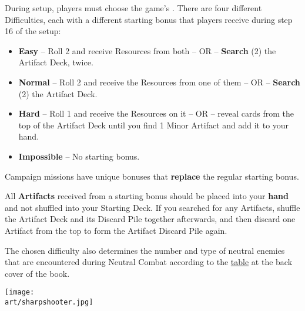 
\begin{multicols}{2}

During setup, players must choose the game's .
There are four different Difficulties, each with a different starting bonus that players receive during step 16 of the setup:
\begin{itemize}
  \item \textbf{Easy} – Roll 2  and receive Resources from both – OR – \textbf{Search} (2) the Artifact Deck, twice.
  \item \textbf{Normal} – Roll 2  and receive the Resources from one of them – OR – \textbf{Search} (2) the Artifact Deck.
  \item \textbf{Hard} – Roll 1  and receive the Resources on it – OR – reveal cards from the top of the Artifact Deck until you find 1 Minor Artifact and add it to your hand.
  \item \textbf{Impossible} – No starting bonus.
\end{itemize}

\columnbreak

Campaign missions have unique bonuses that \textbf{replace} the regular starting bonus.

All \textbf{Artifacts} received from a starting bonus should be placed into your \textbf{hand} and not shuffled into your Starting Deck.
If you searched for any Artifacts, shuffle the Artifact Deck and its Discard Pile together afterwards, and then discard one Artifact from the top to form the Artifact Discard Pile again.\par
The chosen difficulty also determines the number and type of neutral enemies that are encountered during Neutral Combat according to the \hyperlink{Difficulty Table}{table} at the back cover of the book.

\end{multicols}

\texttt{[image: \\art/sharpshooter.jpg]}

\clearpage

